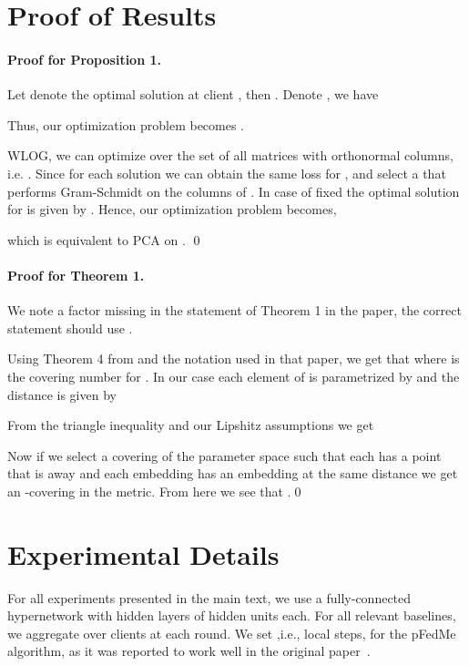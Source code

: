 \documentclass{article}
\begin{document}
\appendix



\section{Proof of Results}\label{app:theory}

\paragraph{Proof for Proposition 1.} Let  denote the optimal solution at client , then . Denote , we have 

Thus, our optimization problem becomes . 

WLOG, we can optimize  over the set of all matrices with orthonormal columns, i.e. . Since for each solution  we can obtain the same loss for , and select a  that performs Gram-Schmidt on the columns of . In case of fixed  the optimal solution for  is given by . Hence, our optimization problem becomes,

which is equivalent to PCA on .
\qed


\paragraph{Proof for Theorem 1.}
We note a  factor missing in the statement of Theorem 1 in the paper, the correct statement should use .

Using Theorem 4 from \cite{baxter2000model} and the notation used in that paper, we get that  where  is the covering number for . In our case each element of  is parametrized by  and the distance is given by 
{\small

}

From the triangle inequality and our Lipshitz assumptions we get

Now if we select a covering of the parameter space such that each  has a point  that is  away and each embedding  has an embedding  at the same distance we get an -covering in the  metric. From here we see that .\qed

\section{Experimental Details}\label{app:exp_details}

For all experiments presented in the main text, we use a fully-connected hypernetwork with  hidden layers of  hidden units each. For all relevant baselines, we aggregate over  clients at each round. We set  ,i.e.,  local steps, for the pFedMe algorithm, as it was reported to work well in the original paper~\citep{Dinh2020PersonalizedFL}.
\end{document}
